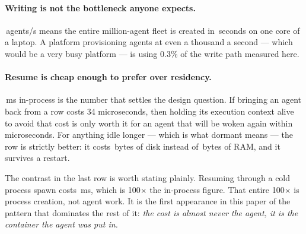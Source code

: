 \paragraph{Writing is not the bottleneck anyone expects.}
\rFleetRate{}\,agents/s means the entire million-agent fleet is created in
\rFleetWriteS{}\,seconds on one core of a laptop. A platform provisioning agents
at even a thousand a second --- which would be a very busy platform --- is using
0.3\% of the write path measured here.

\paragraph{Resume is cheap enough to prefer over residency.}
\rFleetResume{}\,ms in-process is the number that settles the design question.
If bringing an agent back from a row costs 34 microseconds, then holding its
execution context alive to avoid that cost is only worth it for an agent that
will be woken again within microseconds. For anything idle longer --- which is
what dormant means --- the row is strictly better: it costs \rFleetPer{}\,bytes
of disk instead of \rGoPer{}\,bytes of RAM, and it survives a restart.

The contrast in the last row is worth stating plainly. Resuming through a cold
process spawn costs \rFleetResumeCold{}\,ms, which is 100$\times$ the in-process
figure. That entire 100$\times$ is process creation, not agent work. It is the
first appearance in this paper of the pattern that dominates the rest of it:
\emph{the cost is almost never the agent, it is the container the agent was put
in.}
